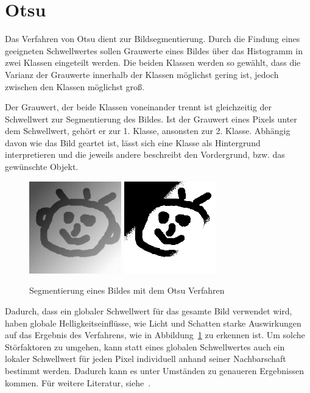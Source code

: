 
\section{Otsu} %
Das Verfahren von Otsu dient zur Bildsegmentierung.
Durch die Findung eines geeigneten Schwellwertes sollen Grauwerte eines Bildes über das Histogramm in zwei Klassen eingeteilt werden.
Die beiden Klassen werden so gewählt, dass die Varianz der Grauwerte innerhalb der Klassen möglichst gering ist, jedoch zwischen den Klassen möglichst groß.

Der Grauwert, der beide Klassen voneinander trennt ist gleichzeitig der Schwellwert zur Segmentierung des Bildes. Ist der Grauwert eines Pixels unter dem Schwellwert, gehört er zur 1. Klasse, ansonsten zur 2. Klasse.
Abhängig davon wie das Bild geartet ist, lässt sich eine Klasse als Hintergrund interpretieren und die jeweils andere beschreibt den Vordergrund, bzw. das gewünschte Objekt.

\begin{figure}[ht]
   \centering
     \includegraphics[width=4cm]{Bilder/otsu-1}
     \includegraphics[width=4cm]{Bilder/otsu-2} \\
 \caption{Segmentierung eines Bildes mit dem Otsu Verfahren}
 \label{fig:Otsu}
\end{figure}

Dadurch, dass ein globaler Schwellwert für das gesamte Bild verwendet wird, haben globale Helligkeitseinflüsse, wie Licht und Schatten starke Auswirkungen auf das Ergebnis des Verfahrens, wie in Abbildung~\ref{fig:Otsu} zu erkennen ist. Um solche Störfaktoren zu umgehen, kann statt eines globalen Schwellwertes auch ein lokaler Schwellwert für jeden Pixel individuell anhand seiner Nachbarschaft bestimmt werden. Dadurch kann es unter Umständen zu genaueren Ergebnissen kommen.
Für weitere Literatur, siehe~\cite{Otsu}.

